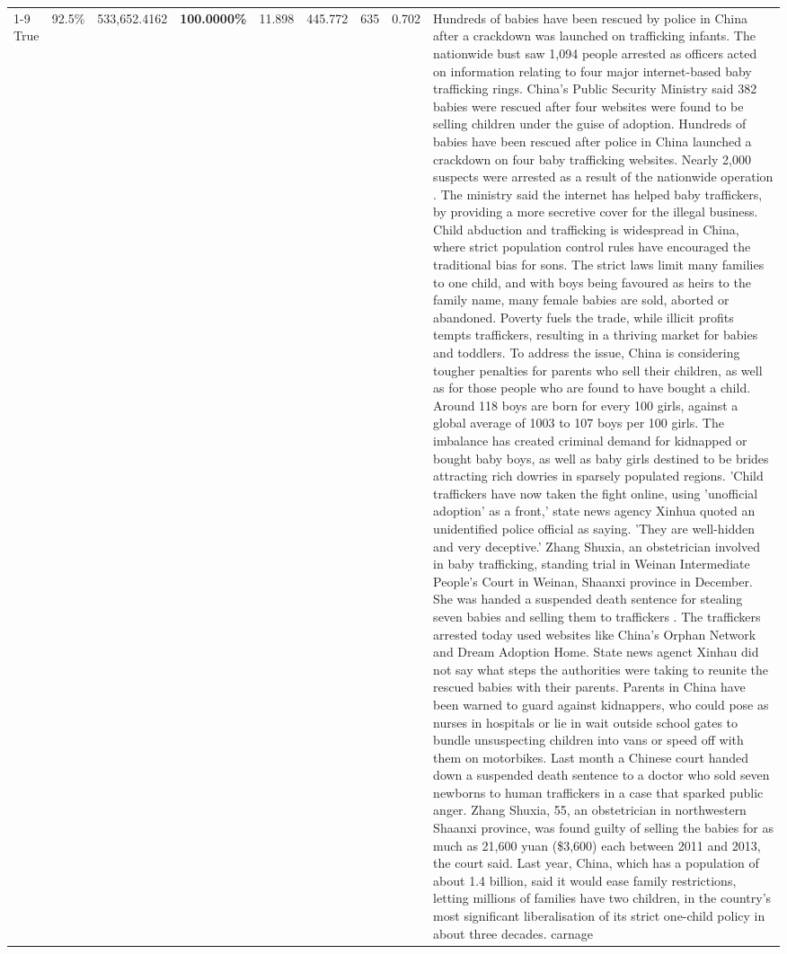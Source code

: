 \begin{table}[H]
\begin{tabular}{lllrlllll}
\cline{1-9}
True & 92.5\% & 533,652.4162 & \bfseries \color{red} 100.0000\% & 11.898 & 445.772 & 635 & 0.702 & Hundreds of babies have been rescued by police in China after a crackdown was launched on trafficking infants. The nationwide bust saw 1,094 people arrested as officers acted on information relating to four major internet-based baby trafficking rings. China's Public Security Ministry said 382 babies were rescued after four websites were found to be selling children under the guise of adoption. Hundreds of babies have been rescued after police in China launched a crackdown on four baby trafficking websites. Nearly 2,000 suspects were arrested as a result of the nationwide operation . The ministry said the internet has helped baby traffickers, by providing a more secretive cover for the illegal business. Child abduction and trafficking is widespread in China, where strict population control rules have encouraged the traditional bias for sons. The strict laws limit many families to one child, and with boys being favoured as heirs to the family name, many female babies are sold, aborted or abandoned. Poverty fuels the trade, while illicit profits tempts traffickers, resulting in a thriving market for babies and toddlers. To address the issue, China is considering tougher penalties for parents who sell their children, as well as for those people who are found to have bought a child. Around 118 boys are born for every 100 girls, against a global average of 1003 to 107 boys per 100 girls. The imbalance has created criminal demand for kidnapped or bought baby boys, as well as baby girls destined to be brides attracting rich dowries in sparsely populated regions. 'Child traffickers have now taken the fight online, using 'unofficial adoption' as a front,' state news agency Xinhua quoted an unidentified police official as saying. 'They are well-hidden and very deceptive.' Zhang Shuxia, an obstetrician involved in baby trafficking, standing trial in Weinan Intermediate People's Court in Weinan, Shaanxi province in December. She was handed a suspended death sentence for stealing seven babies and selling them to traffickers . The traffickers arrested today used websites like China's Orphan Network and Dream Adoption Home. State news agenct Xinhau did not say what steps the authorities were taking to reunite the rescued babies with their parents. Parents in China have been warned to guard against kidnappers, who could pose as nurses in hospitals or lie in wait outside school gates to bundle unsuspecting children into vans or speed off with them on motorbikes. Last month a Chinese court handed down a suspended death sentence to a doctor who sold seven newborns to human traffickers in a case that sparked public anger. Zhang Shuxia, 55, an obstetrician in northwestern Shaanxi province, was found guilty of selling the babies for as much as 21,600 yuan (\$3,600) each between 2011 and 2013, the court said. Last year, China, which has a population of about 1.4 billion, said it would ease family restrictions, letting millions of families have two children, in the country's most significant liberalisation of its strict one-child policy in about three decades. carnage \\

\end{tabular}
\end{table}
